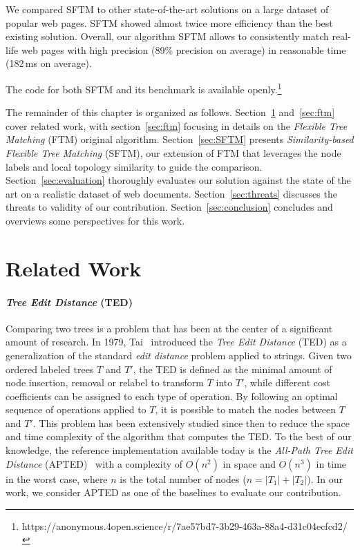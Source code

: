 We compared SFTM to other state-of-the-art solutions on a large dataset of popular web pages.
SFTM showed almost twice more efficiency than the best existing solution.
Overall, our algorithm SFTM allows to consistently match real-life web pages with high precision (89\% precision on average) in reasonable time (182\,ms on average).

The code for both SFTM and its benchmark is available openly.\footnote{https://anonymous.4open.science/r/7ae57bd7-3b29-463a-88a4-d31c04ecfcd2/}

The remainder of this chapter is organized as follows.
Section~\ref{sec:related_work} and~\ref{sec:ftm} cover related work, with section~\ref{sec:ftm} focusing in details on the \emph{Flexible Tree Matching} (FTM) original algorithm.
Section~\ref{sec:SFTM} presents \emph{Similarity-based Flexible Tree Matching} (SFTM), our extension of FTM that leverages the node labels and local topology similarity to guide the comparison.
Section~\ref{sec:evaluation} thoroughly evaluates our solution against the state of the art on a realistic dataset of web documents.
Section~\ref{sec:threats} discusses the threats to validity of our contribution.
Section~\ref{sec:conclusion} concludes and overviews some perspectives for this work.

\section{Related Work}\label{sec:related_work}
\paragraph{\bf \emph{Tree Edit Distance} (TED)}\label{sec:ted}
Comparing two trees is a problem that has been at the center of a significant amount of research.
In 1979, Tai~\cite{Tai1979} introduced the \emph{Tree Edit Distance} (TED) as a generalization of the standard \emph{edit distance} problem applied to strings.
Given two ordered labeled trees $T$ and $T'$, the TED is defined as the minimal amount of node insertion, removal or relabel to transform $T$ into $T'$, while different cost coefficients can be assigned to each type of operation.
By following an optimal sequence of operations applied to $T$, it is possible to match the nodes between $T$ and $T'$.
This problem has been extensively studied since then to reduce the space and time complexity of the algorithm that computes the TED.
To the best of our knowledge, the reference implementation available today is the \emph{All-Path Tree Edit Distance} (APTED)~\cite{Pawlik2011, pawlik2015efficient, pawlik2016tree} with a complexity of $O(n^2)$ in space and $O(n^3)$ in time in the worst case, where $n$ is the total number of nodes ($n = |T_1|+|T_2|$).
In our work, we consider APTED as one of the baselines to evaluate our contribution.

